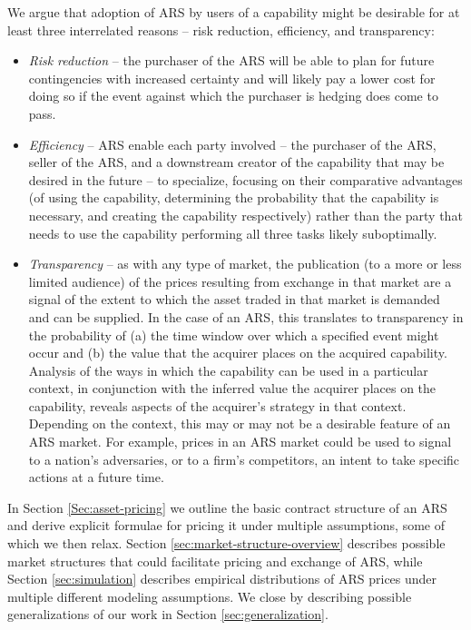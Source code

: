 \documentclass{article}
\begin{document}
We argue that adoption of ARS by users of a capability might be desirable for at least three interrelated reasons -- risk reduction, efficiency, and transparency:
\begin{itemize}
    \item \textit{Risk reduction} -- the purchaser of the ARS will be able to plan for future contingencies with increased certainty and will likely pay a lower cost for doing so if the event against which the purchaser is hedging does come to pass.
    \item \textit{Efficiency} -- ARS enable each party involved -- the purchaser of the ARS, seller of the ARS, and a downstream creator of the capability that may be desired in the future -- to specialize, focusing on their comparative advantages (of using the capability, determining the probability that the capability is necessary, and creating the capability respectively) rather than the party that needs to use the capability performing all three tasks likely suboptimally.
    \item \textit{Transparency} -- as with any type of market, the publication (to a more or less limited audience) of the prices resulting from exchange in that market are a signal of the extent to which the asset traded in that market is demanded and can be supplied. 
    In the case of an ARS, this translates to transparency in the probability of (a) the time window over which a specified event might occur and (b) the value that the acquirer places on the acquired capability. Analysis of the ways in which the capability can be used in a particular context, in conjunction with the inferred value the acquirer places on the capability, reveals aspects of the acquirer's strategy in that context. Depending on the context, this may or may not be a desirable feature of an ARS market. 
    For example, prices in an ARS market could be used to signal to a nation's adversaries, or to a firm's competitors, an intent to take specific actions at a future time.
\end{itemize}
In Section \ref{Sec:asset-pricing} we outline the basic contract structure of an ARS and derive explicit formulae for pricing it under multiple assumptions, some of which we then relax.
Section \ref{sec:market-structure-overview} describes possible market structures that could facilitate pricing and exchange of ARS, while Section \ref{sec:simulation} describes empirical distributions of ARS prices under multiple different modeling assumptions. We close by describing possible generalizations of our work in Section \ref{sec:generalization}.
\end{document}
